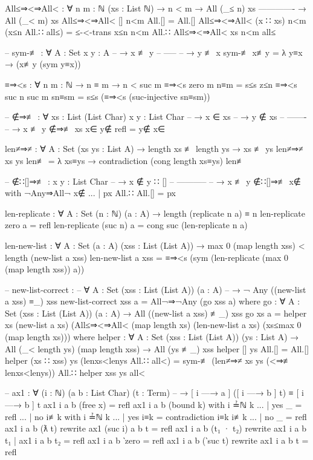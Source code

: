 \documentclass[logo,bsc,singlespacing,parskip,online]{infthesis}
\renewenvironment{code}{\mintedcopy[breaklines,breaksymbolleft=\;]{agda}}{\endmintedcopy}
\begin{document}
\begin{code}
All≤⇒<⇒All< : ∀ {n m : ℕ} (xs : List ℕ)
  → n < m
  → All (_≤ n) xs
    -------------
  → All (_< m) xs
All≤⇒<⇒All< [] n<m All.[] = All.[]
All≤⇒<⇒All< (x ∷ xs) n<m (x≤n All.∷ all≤) =
  ≤-<-trans x≤n n<m All.∷ All≤⇒<⇒All< xs n<m all≤

-- sym-≢ : ∀ {A : Set} {x y : A}
--   → x ≢ y
--     -----
--   → y ≢ x
sym-≢ x≢y = λ y≡x → (x≢y (sym y≡x))

≡⇒<s : ∀ {n m : ℕ} → n ≡ m → n < suc m
≡⇒<s {zero} {m} n≡m = s≤s z≤n
≡⇒<s {suc n} {suc m} sn≡sm = s≤s (≡⇒<s (suc-injective sn≡sm))

-- ∉⇒≢ : ∀ {xs : List (List Char)} {x y : List Char}
--   → x ∈ xs
--   → y ∉ xs
--     -------
--   → x ≢ y
∉⇒≢ {xs} x∈ y∉ refl = y∉ x∈

len≠⇒≠ : ∀ {A : Set} (xs ys : List A)
  → length xs ≢ length ys → xs ≢ ys
len≠⇒≠ xs ys len≢ =
  λ xs≡ys → contradiction (cong length xs≡ys) len≢

-- ∉∷[]⇒≢ : {x y : List Char}
--   → x ∉ y ∷ []
--     -----------
--   → x ≢ y
∉∷[]⇒≢ x∉ with ¬Any⇒All¬ x∉
... | px All.∷ All.[] = px

len-replicate : ∀ {A : Set} (n : ℕ) (a : A)
  → length (replicate n a) ≡ n
len-replicate zero a = refl
len-replicate (suc n) a = cong suc (len-replicate n a)

len-new-list : ∀ {A : Set} (a : A) (xss : List (List A))
  → max 0 (map length xss) < length (new-list a xss)
len-new-list a xss =
  ≡⇒<s (sym (len-replicate (max 0 (map length xss)) a))

-- new-list-correct :
--   ∀ {A : Set} (xss : List (List A)) (a : A)
--   → ¬ Any ((new-list a xss) ≡_) xss
new-list-correct xss a = All¬⇒¬Any (go xss a)
  where
    go : ∀ {A : Set} (xss : List (List A)) (a : A)
      → All ((new-list a xss) ≢_) xss
    go xs a =
      helper
        xs
        (new-list a xs)
        (All≤⇒<⇒All<
          (map length xs)
          (len-new-list a xs)
          (xs≤max 0 (map length xs)))
      where
        helper : ∀ {A : Set} (xss : List (List A)) (ys : List A)
          → All (_< length ys) (map length xss)
          → All (ys ≢_) xss
        helper [] ys All.[] = All.[]
        helper (xs ∷ xss) ys (lenxs<lenys All.∷ all<) =
          sym-≢ (len≠⇒≠ xs ys (<⇒≢ lenxs<lenys))
            All.∷ helper xss ys all<

-- ax1 : ∀ (i : ℕ) (a b : List Char) (t : Term)
--   → [ i —→ a ] ([ i —→ b ] t) ≡ [ i —→ b ] t
ax1 i a b (free x) = refl
ax1 i a b (bound k) with i ≟ℕ k
... | yes _   = refl
... | no  i≢k with i ≟ℕ k
...   | yes i≡k = contradiction i≡k i≢k
...   | no  _   = refl
ax1 i a b (ƛ t) rewrite ax1 (suc i) a b t = refl
ax1 i a b (t₁ · t₂) rewrite ax1 i a b t₁ | ax1 i a b t₂ = refl
ax1 i a b ‵zero = refl
ax1 i a b (‵suc t) rewrite ax1 i a b t = refl


\end{code}
\end{document}
